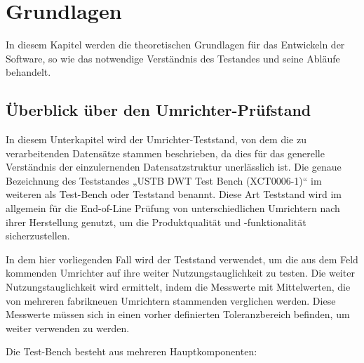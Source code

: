 
\newpage
\section{Grundlagen}
\label{Grundlagen}
In diesem Kapitel werden die theoretischen Grundlagen für das Entwickeln der Software,
so wie das notwendige Verständnis des Testandes und seine Abläufe behandelt.
\subsection{Überblick über den Umrichter-Prüfstand}
In diesem Unterkapitel wird der Umrichter-Teststand, von dem die zu verarbeitenden Datensätze stammen beschrieben,
da dies für das generelle Verständnis der einzulernenden Datensatzstruktur unerlässlich ist.
Die genaue Bezeichnung des Teststandes „USTB DWT Test Bench (XCT0006-1)“ im weiteren als Test-Bench oder Teststand benannt.
Diese Art Teststand wird im allgemein für die End-of-Line Prüfung von unterschiedlichen Umrichtern nach ihrer Herstellung genutzt,
um die Produktqualität und -funktionalität sicherzustellen.\cite*{Main_Manuel_USTB2018}

In dem hier vorliegenden Fall wird der Teststand verwendet, um die aus dem Feld kommenden Umrichter auf ihre weiter Nutzungstauglichkeit zu testen.
Die weiter Nutzungstauglichkeit wird ermittelt, indem die Messwerte mit Mittelwerten, die von mehreren fabrikneuen Umrichtern stammenden verglichen werden.
Diese Messwerte müssen sich in einen vorher definierten Toleranzbereich befinden, um weiter verwenden zu werden.

Die Test-Bench besteht aus mehreren Hauptkomponenten:

